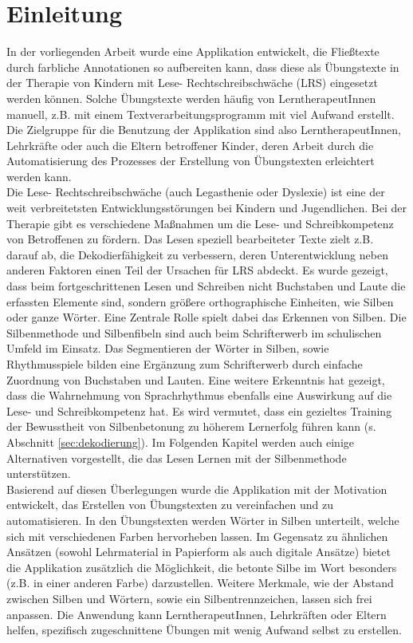 
\chapter{Einleitung}

In der vorliegenden Arbeit wurde eine Applikation entwickelt, die Fließtexte durch farbliche Annotationen so aufbereiten kann, dass diese als Übungstexte in der Therapie von Kindern mit Lese- Rechtschreibschwäche (LRS) eingesetzt werden können. Solche Übungstexte werden häufig von LerntherapeutInnen manuell, z.B. mit einem Textverarbeitungsprogramm mit viel Aufwand erstellt. Die Zielgruppe für die Benutzung der Applikation sind also LerntherapeutInnen, Lehrkräfte oder auch die Eltern betroffener Kinder, deren Arbeit durch die Automatisierung des Prozesses der Erstellung von Übungstexten erleichtert werden kann.\\

Die Lese- Rechtschreibschwäche (auch Legasthenie oder Dyslexie) ist eine der weit verbreitetsten Entwicklungsstörungen bei Kindern und Jugendlichen\cite{Mayer2016}. Bei der Therapie gibt es verschiedene Maßnahmen um die Lese- und Schreibkompetenz von Betroffenen zu fördern. Das Lesen speziell bearbeiteter Texte zielt z.B. darauf ab, die Dekodierfähigkeit zu verbessern, deren Unterentwicklung neben anderen Faktoren einen Teil der Ursachen für LRS abdeckt\cite{Schulte-Koerne2014}. Es wurde gezeigt, dass beim fortgeschrittenen Lesen und Schreiben nicht Buchstaben und Laute die erfassten Elemente sind, sondern größere orthographische Einheiten, wie Silben oder ganze Wörter\cite{Steinbrink2014}. Eine Zentrale Rolle spielt dabei das Erkennen von Silben. Die Silbenmethode und Silbenfibeln sind auch beim Schrifterwerb im schulischen Umfeld im Einsatz. Das Segmentieren der Wörter in Silben, sowie Rhythmusspiele bilden eine Ergänzung zum Schrifterwerb durch einfache Zuordnung von Buchstaben und Lauten\cite{Bredel2010}. Eine weitere Erkenntnis hat gezeigt, dass die Wahrnehmung von Sprachrhythmus ebenfalls eine Auswirkung auf die Lese- und Schreibkompetenz hat\cite{Brandelik2014}. Es wird vermutet, dass ein gezieltes Training der Bewusstheit von Silbenbetonung zu höherem Lernerfolg führen kann\cite{Holz2017} (s. Abschnitt \ref{sec:dekodierung}). Im Folgenden Kapitel werden auch einige Alternativen vorgestellt, die das Lesen Lernen mit der Silbenmethode unterstützen.\\
Basierend auf diesen Überlegungen wurde die Applikation mit der Motivation entwickelt, das Erstellen von Übungstexten zu vereinfachen und zu automatisieren. In den Übungstexten werden Wörter in Silben unterteilt, welche sich mit verschiedenen Farben hervorheben lassen. Im Gegensatz zu ähnlichen Ansätzen (sowohl Lehrmaterial in Papierform als auch digitale Ansätze) bietet die Applikation zusätzlich die Möglichkeit, die betonte Silbe im Wort besonders (z.B. in einer anderen Farbe) darzustellen. Weitere Merkmale, wie der Abstand zwischen Silben und Wörtern, sowie ein Silbentrennzeichen, lassen sich frei anpassen. Die Anwendung kann LerntherapeutInnen, Lehrkräften oder Eltern helfen, spezifisch zugeschnittene Übungen mit wenig Aufwand selbst zu erstellen.\\

